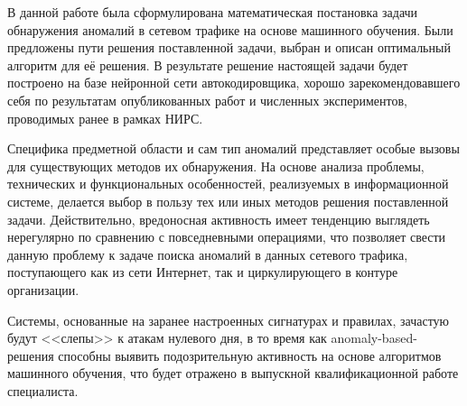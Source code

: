 \conclusion

В данной работе была сформулирована математическая постановка задачи обнаружения аномалий в сетевом трафике на основе машинного обучения. Были предложены пути решения поставленной задачи, выбран и описан оптимальный алгоритм для её решения. В результате решение настоящей задачи будет построено на базе нейронной сети автокодировщика, хорошо зарекомендовавшего себя по результатам опубликованных работ и численных экспериментов, проводимых ранее в рамках НИРС.

Специфика предметной области и сам тип аномалий представляет особые вызовы для существующих методов их обнаружения. На основе анализа проблемы, технических и функциональных особенностей, реализуемых в информационной системе, делается выбор в пользу тех или иных методов решения поставленной задачи. Действительно, вредоносная активность имеет тенденцию выглядеть нерегулярно по сравнению с повседневными операциями, что позволяет свести данную проблему к задаче поиска аномалий в данных сетевого трафика, поступающего как из сети Интернет, так и циркулирующего в контуре организации.

Системы, основанные на заранее настроенных сигнатурах и правилах, зачастую будут <<слепы>> к атакам нулевого дня, в то время как anomaly-based-решения способны выявить подозрительную активность на основе алгоритмов машинного обучения, что будет отражено в выпускной квалификационной работе специалиста.
